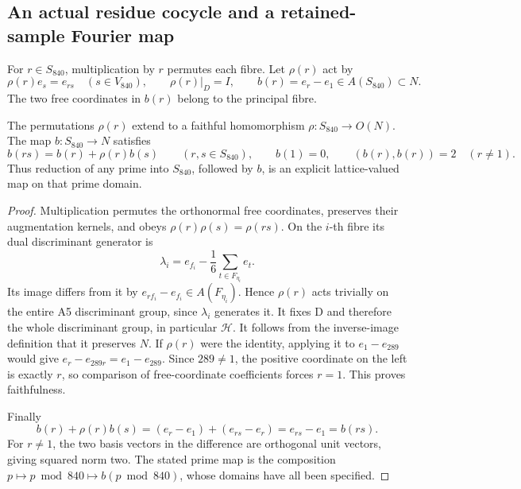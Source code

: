 \subsection{An actual residue cocycle and a retained-sample Fourier map}
\label{esn:subsec:cocycle-fourier}

For \(r\in S_{840}\), multiplication by \(r\) permutes each fibre.
Let \(\rho(r)\) act by
\begin{equation}
 \rho(r)e_s=e_{rs}\quad(s\in V_{840}),\qquad
 \rho(r)|_D=I,
 \qquad b(r)=e_r-e_1\in A(S_{840})\subset N.
 \label{esn:eq:residue-action-cocycle}
\end{equation}
The two free coordinates in \(b(r)\) belong to the principal fibre.

\begin{theorem}
\label{esn:thm:residue-cocycle}
The permutations \(\rho(r)\) extend to a faithful homomorphism
\(\rho:S_{840}\to O(N)\).  The map \(b:S_{840}\to N\) satisfies
\begin{equation}
 b(rs)=b(r)+\rho(r)b(s)\qquad(r,s\in S_{840}),
 \qquad b(1)=0,\qquad (b(r),b(r))=2\quad(r\ne1).
 \label{esn:eq:cocycle-identity}
\end{equation}
Thus reduction of any prime into \(S_{840}\), followed by \(b\),
is an explicit lattice-valued map on that prime domain.
\end{theorem}

\begin{proof}
Multiplication permutes the orthonormal free coordinates, preserves
their augmentation kernels, and obeys \(\rho(r)\rho(s)=\rho(rs)\).
On the \(i\)-th fibre its dual discriminant generator is
\[
 \lambda_i=e_{f_i}-\frac16\sum_{t\in F_{\eta_i}}e_t.
\]
Its image differs from it by
\(e_{rf_i}-e_{f_i}\in A(F_{\eta_i})\).  Hence \(\rho(r)\)
acts trivially on the entire A5 discriminant group, since
\(\lambda_i\) generates it.  It fixes D and therefore the whole
discriminant group, in particular \(\mathcal H\).
It follows from the inverse-image definition that it preserves \(N\).
If \(\rho(r)\) were the identity, applying it to
\(e_1-e_{289}\) would give
\(e_r-e_{289r}=e_1-e_{289}\).  Since \(289\ne1\), the
positive coordinate on the left is exactly \(r\), so comparison of
free-coordinate coefficients forces \(r=1\).  This proves faithfulness.

Finally
\[
 b(r)+\rho(r)b(s)
   =(e_r-e_1)+(e_{rs}-e_r)=e_{rs}-e_1=b(rs).
\]
For \(r\ne1\), the two basis vectors in the difference are
orthogonal unit vectors, giving squared norm two.  The stated prime map
is the composition \(p\mapsto p\bmod840\mapsto b(p\bmod840)\),
whose domains have all been specified.
\end{proof}

